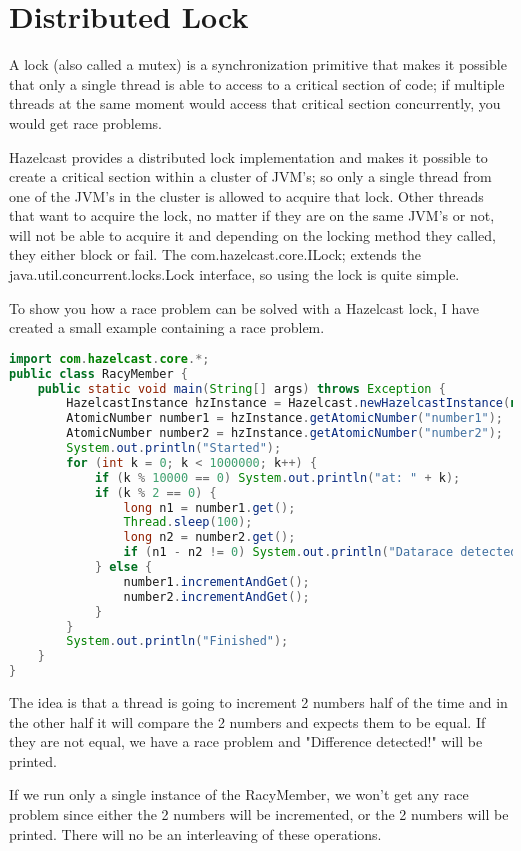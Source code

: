 \section{Distributed Lock}
A lock (also called a mutex) is a synchronization primitive that makes it possible that only a single thread is able to access to a critical section of code; if multiple threads at the same moment would access that critical section concurrently, you would get race problems. 

Hazelcast provides a distributed lock implementation and makes it possible to create a critical section within a cluster of JVM's; so only a single thread from one of the JVM's in the cluster is allowed to acquire that lock. Other threads that want to acquire the lock, no matter if they are on the same JVM's or not, will not be able to acquire it and depending on the locking method they called, they either block or fail. The com.hazelcast.core.ILock; extends the java.util.concurrent.locks.Lock interface, so using the lock is quite simple.

To show you how a race problem can be solved with a Hazelcast lock, I have created a small example containing a race problem.
\begin{lstlisting}[language=java]
import com.hazelcast.core.*;
public class RacyMember {
    public static void main(String[] args) throws Exception {
        HazelcastInstance hzInstance = Hazelcast.newHazelcastInstance(null);
        AtomicNumber number1 = hzInstance.getAtomicNumber("number1");
        AtomicNumber number2 = hzInstance.getAtomicNumber("number2");
        System.out.println("Started");
        for (int k = 0; k < 1000000; k++) {
            if (k % 10000 == 0) System.out.println("at: " + k);
            if (k % 2 == 0) {
                long n1 = number1.get();
                Thread.sleep(100);
                long n2 = number2.get();
                if (n1 - n2 != 0) System.out.println("Datarace detected!");
            } else {
                number1.incrementAndGet();
                number2.incrementAndGet();
            }
        }
        System.out.println("Finished");
    }
}
\end{lstlisting}
The idea is that a thread is going to increment 2 numbers half of the time and in the other half it will compare the 2 numbers and expects them to be equal. If they are not equal, we have a race problem and "Difference detected!" will be printed.

If we run only a single instance of the RacyMember, we won't get any race problem since either the 2 numbers will be incremented, or the 2 numbers will be printed. There will no be an interleaving of these operations.

